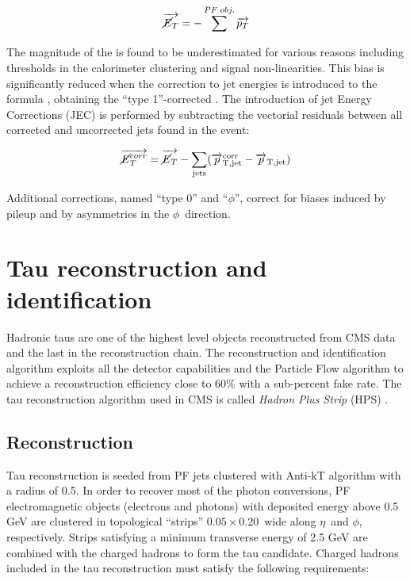 \begin{equation}
\vec{\cancel{E}_T} = -\sum^{PF\;obj.} \vec{p_{T}}
\end{equation}

The magnitude of the \MET is found to be underestimated for various reasons including thresholds in the calorimeter clustering and signal non-linearities. This bias is significantly reduced when the correction to jet energies is introduced to the formula \cite{Chatrchyan:2011ds}, obtaining the ``type 1''-corrected \MET. The introduction of jet Energy Corrections (JEC) is performed by subtracting the vectorial residuals between all corrected and uncorrected jets found in the event:

\begin{equation}
\vec{\cancel{E}_T^{corr}} = \vec{\cancel{E}_T } - \sum_\mathrm{jets} (\vec{p}_\mathrm{T,jet}^\mathrm{corr}-\vec{p}_\mathrm{T,jet})
\label{eq:Type1MET}
\end{equation}

Additional corrections, named ``type 0'' and ``$\phi$'', correct for biases induced by pileup and by asymmetries in the $\phi$\ direction.

\section{Tau reconstruction and identification}
\label{sec:tau_id}

Hadronic taus are one of the highest level objects reconstructed from CMS data and the last in the reconstruction chain. The reconstruction and identification algorithm exploits all the detector capabilities and the Particle Flow algorithm to achieve a reconstruction efficiency close to 60\% with a sub-percent fake rate. The tau reconstruction algorithm used in CMS is called \emph{Hadron Plus Strip} (HPS) \cite{CMS-PAS-TAU-11-001}. 

\subsection{Reconstruction}

Tau reconstruction is seeded from PF jets clustered with Anti-kT algorithm with a radius of 0.5. In order to recover most of the photon conversions, PF electromagnetic objects (electrons and photons) with deposited energy above 0.5 GeV are clustered in topological ``strips'' $0.05 \times 0.20$\ wide along $\eta$\ and $\phi$, respectively. Strips satisfying a minimum transverse energy of 2.5 GeV are combined with the charged hadrons to form the tau candidate. Charged hadrons included in the tau reconstruction must satisfy the following requirements:

